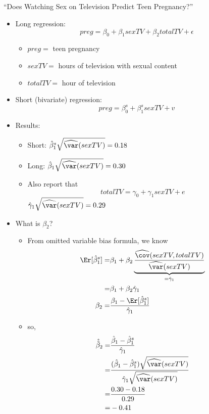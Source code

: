 \subsection{\cite{chandra2008}}
\begin{frame}[allowframebreaks]
  \frametitle{\cite{chandra2008}}
  ``Does Watching
  Sex on Television Predict Teen Pregnancy?''
  \begin{itemize}
  \item Long regression:
    \[ preg = \beta_0 + \beta_1 sexTV + \beta_2 totalTV + \epsilon \]
    \begin{itemize}
    \item $preg = $ teen pregnancy
    \item $sexTV =$ hours of television with sexual content
    \item $totalTV=$ hour of television
    \end{itemize}
  \item Short (bivariate) regression:
    \[ preg = \beta_0^s + \beta_1^s sexTV + v \]
  \item Results:
    \begin{itemize}      
    \item Short: $\hat{\beta}_1^s \sqrt{\widehat{\var}(sexTV)} = 0.18$ 
    \item Long: $\hat{\beta}_1 \sqrt{\widehat{\var}(sexTV)} = 0.30$
    \item Also report that
      \[ totalTV = \gamma_0 + \gamma_1 sexTV + e \]
      $\hat{\gamma}_1 \sqrt{\widehat{\var}(sexTV)} = 0.29$
    \end{itemize}
  \item What is $\beta_2$?   
    \begin{itemize}
    \item From omitted variable bias formula, we know
      \begin{align*}
        \Er[\hat{\beta}_1^s] = & \beta_1 + \beta_2
        \underbrace{\frac{\widehat{\cov}(sexTV,totalTV)}{\widehat{\var}(sexTV)}}_{=
          \hat{\gamma}_1}
        \\
        = & \beta_1 + \beta_2 \hat{\gamma}_1 \\
        \beta_2 = & \frac{\beta_1 -
          \Er[\hat{\beta}_1^s]}{\hat{\gamma}_1} 
      \end{align*}
    \item so,
      \begin{align*}
        \hat{\hat{\beta}}_2 = & \frac{\hat{\beta}_1 -
          \hat{\beta}_1^s}{\hat{\gamma}_1} \\
        = & \frac{(\hat{\beta}_1 -
          \hat{\beta}_1^s)
          \sqrt{\widehat{\var}(sexTV)}}{\hat{\gamma}_1
          \sqrt{\widehat{\var}(sexTV)}} \\
        = & \frac{0.30 - 0.18}{0.29} \\
        = & -0.41
      \end{align*}
    \end{itemize}
  \end{itemize}  
\end{frame}

